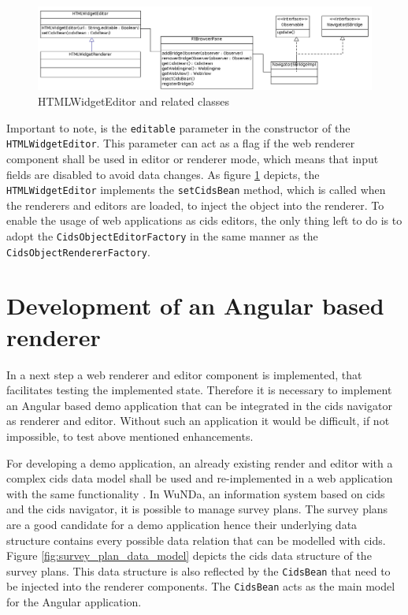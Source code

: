 \begin{figure}
	\centering	\includegraphics[width=1.0\textwidth]{./img/classDiagramms/html_editor.png}
	\caption{HTMLWidgetEditor and related classes}
	\label{fig:class_diag_html_widget_editor}
\end{figure}

Important to note, is the \texttt{editable} parameter in the constructor of the \texttt{HTMLWidgetEditor}. 
This parameter can act as a flag if  the web renderer component shall be used in editor or renderer mode, which means that input fields are disabled to avoid data changes.
As figure \ref{fig:class_diag_html_widget_editor} depicts, the \texttt{HTMLWidgetEditor} implements the \texttt{setCidsBean} method, which is called when the renderers and editors are loaded, to inject the object into the renderer.
To enable the usage of web applications as cids editors, the only thing left to do is to adopt the \texttt{CidsObjectEditorFactory} in the same manner as the \texttt{CidsObjectRendererFactory}.

\section{Development of an Angular based renderer}

In a next step a web renderer and editor component is implemented, that facilitates testing the implemented state.
Therefore it is necessary to implement an Angular based demo application that can be integrated in the cids navigator as renderer and editor.
Without such an application it would be difficult, if not impossible, to test  above mentioned enhancements.

For developing a demo application, an already existing render and editor with a complex cids data model shall be used and re-implemented in a web application with the same functionality .
In WuNDa, an information system based on cids and the cids navigator, it is possible to manage survey plans.
The survey plans are a good candidate for a demo application hence their underlying data structure contains every possible data relation that can be modelled with cids.
Figure \ref{fig:survey_plan_data_model} depicts the cids data structure of the survey plans.
This data structure is also reflected by the \texttt{CidsBean} that need to be injected into the renderer components.
The \texttt{CidsBean} acts as the main model for the Angular application.

